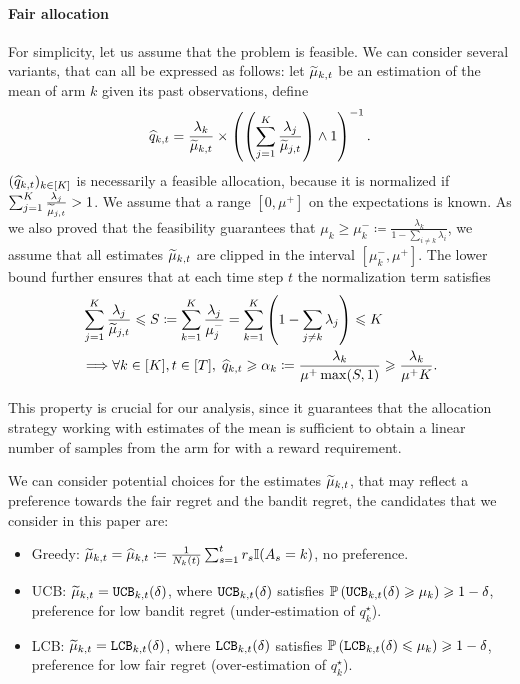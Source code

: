 \paragraph{Fair allocation} For simplicity, let us assume that the problem is feasible. We can consider several variants, that can all be expressed as follows: let $\widetilde{\mu}_{k,t}$ be an estimation of the mean of arm $k$ given its past observations, define \[ \widehat{q}_{k,t}= \frac{\lambda_k}{\widetilde{\mu}_{k, t}} \times \left(\left(\sum_{j=1}^K \frac{\lambda_j}{\widetilde{\mu}_{j, t}}\right) \wedge 1\right)^{-1}.\] 
$(\widehat{q}_{k, t})_{k \in [K]}$ is necessarily a feasible allocation, because it is normalized if $\sum_{j=1}^K \frac{\lambda_j}{\widetilde{\mu}_{j, t}}> 1$. We assume that a range $[0, \mu^+]$ on the expectations is known. As we also proved that the feasibility guarantees that $\mu_k \geq \mu_k^- \coloneqq \frac{\lambda_k}{1-\sum_{i\neq k}\lambda_i}$, we assume that all estimates $\widetilde{\mu}_{k,t}$ are clipped in the interval $[\mu_k^-, \mu^+]$. The lower bound further ensures that at each time step $t$ the normalization term satisfies 
\begin{align*}
&\sum_{j=1}^K \frac{\lambda_j}{\widetilde{\mu}_{j, t}} \leqslant S \coloneqq \sum_{k=1}^K \frac{\lambda_j}{\mu_j^-}=\sum_{k=1}^K \left(1-\sum_{j\neq k} \lambda_j\right) \leqslant K \\
& \Longrightarrow \forall k\in[K], t\in[T], \; \widehat{q}_{k, t}\geqslant \alpha_k \coloneqq \frac{\lambda_k}{\mu^+ \max(S, 1)}\geqslant \frac{\lambda_k}{\mu^+ K}. 
\end{align*}

This property is crucial for our analysis, since it guarantees that the allocation strategy working with estimates of the mean is sufficient to obtain a linear number of samples from the arm for with a reward requirement. 


We can consider potential choices for the estimates $\widetilde{\mu}_{k,t}$, that may reflect a preference towards the fair regret and the bandit regret, the candidates that we consider in this paper are:
\begin{itemize}
	\item Greedy: $\widetilde{\mu}_{k, t} = \widehat{\mu}_{k, t} \coloneqq \frac{1}{N_k(t)}\sum_{s=1}^t r_s\mathbb{I}(A_s=k)$, no preference.
	\item UCB: $\widetilde{\mu}_{k, t} = \texttt{UCB}_{k, t}(\delta)$, where $\texttt{UCB}_{k, t}(\delta)$ satisfies $\mathbb{P}\left(\texttt{UCB}_{k, t}(\delta) \geqslant \mu_k\right) \geqslant 1-\delta$, preference for low bandit regret (under-estimation of $q_k^\star$).
	\item LCB: $\widetilde{\mu}_{k, t} = \texttt{LCB}_{k, t}(\delta)$, where $\texttt{LCB}_{k, t}(\delta)$ satisfies $\mathbb{P}\left(\texttt{LCB}_{k, t}(\delta) \leqslant \mu_k\right) \geqslant 1-\delta$, preference for low fair regret (over-estimation of $q_k^\star$).
\end{itemize}

